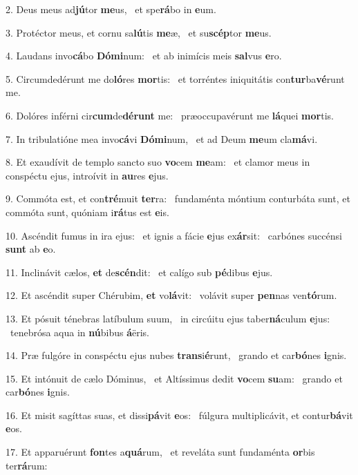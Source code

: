 2. Deus meus ad\textbf{jú}tor \textbf{me}us, \ast\  et spe\textbf{rá}bo in \textbf{e}um.\

3. Protéctor meus, et cornu sa\textbf{lú}tis \textbf{me}æ, \ast\  et su\textbf{scép}tor \textbf{me}us.\

4. Laudans invo\textbf{cá}bo \textbf{Dó}\textbf{mi}num: \ast\  et ab inimícis meis \textbf{sal}vus \textbf{e}ro.\

5. Circumdedérunt me do\textbf{ló}res \textbf{mor}tis: \ast\  et torréntes iniquitátis con\textbf{tur}ba\textbf{vé}runt me.\

6. Dolóres inférni cir\textbf{cum}de\textbf{dé}\textbf{runt} me: \ast\  præoccupavérunt me \textbf{lá}quei \textbf{mor}tis.\

7. In tribulatióne mea invo\textbf{cá}vi \textbf{Dó}\textbf{mi}num, \ast\  et ad Deum \textbf{me}um cla\textbf{má}vi.\

8. Et exaudívit de templo sancto suo \textbf{vo}cem \textbf{me}am: \ast\  et clamor meus in conspéctu ejus, introívit in \textbf{au}res \textbf{e}jus.\

9. Commóta est, et con\textbf{tré}muit \textbf{ter}ra: \ast\  fundaménta móntium conturbáta sunt, et commóta sunt, quóniam i\textbf{rá}tus est \textbf{e}is.\

10. Ascéndit fumus in ira ejus: \dag\  et ignis a fácie \textbf{e}jus ex\textbf{ár}sit: \ast\  carbónes succénsi \textbf{sunt} ab \textbf{e}o.\

11. Inclinávit cælos, \textbf{et} de\textbf{scén}dit: \ast\  et calígo sub \textbf{pé}dibus \textbf{e}jus.\

12. Et ascéndit super Chérubim, \textbf{et} vo\textbf{lá}vit: \ast\  volávit super \textbf{pen}nas ven\textbf{tó}rum.\

13. Et pósuit ténebras latíbulum suum, \dag\  in circúitu ejus taber\textbf{ná}culum \textbf{e}jus: \ast\  tenebrósa aqua in \textbf{nú}bibus \textbf{á}ëris.\

14. Præ fulgóre in conspéctu ejus nubes \textbf{trans}i\textbf{é}runt, \ast\  grando et car\textbf{bó}nes \textbf{i}gnis.\

15. Et intónuit de cælo Dóminus, \dag\  et Altíssimus dedit \textbf{vo}cem \textbf{su}am: \ast\  grando et car\textbf{bó}nes \textbf{i}gnis.\

16. Et misit sagíttas suas, et dissi\textbf{pá}vit \textbf{e}os: \ast\  fúlgura multiplicávit, et contur\textbf{bá}vit \textbf{e}os.\

17. Et apparuérunt \textbf{fon}tes a\textbf{quá}rum, \ast\  et reveláta sunt fundaménta \textbf{or}bis ter\textbf{rá}rum:\

